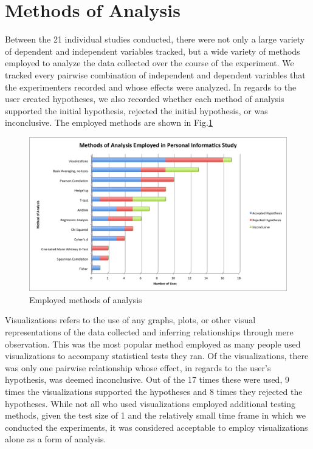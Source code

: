 \section{Methods of Analysis}
Between the 21 individual studies conducted, there were not only a large variety of dependent and independent variables tracked, but a wide variety of methods employed to analyze the data collected over the course of the experiment.  We tracked every pairwise combination of independent and dependent variables that the experimenters recorded and whose effects were analyzed.  In regards to the user created hypotheses, we also recorded whether each method of analysis supported the initial hypothesis, rejected the initial hypothesis, or was inconclusive.  The employed methods are shown in Fig.\ref{fig:analysis}

\begin{figure}[!t]\centering
\includegraphics[width=1.0\columnwidth]{images/Methods_of_Analysis.png}
\caption{\footnotesize Employed methods of analysis \label{fig:analysis} 
}%
\end{figure}


Visualizations refers to the use of any graphs, plots, or other visual representations of the data collected and inferring relationships through mere observation.  This was the most popular method employed as many people used visualizations to accompany statistical tests they ran.  Of the visualizations, there was only one pairwise relationship whose effect, in regards to the user’s hypothesis, was deemed inconclusive.  Out of the 17 times these were used, 9 times the visualizations supported the hypotheses and 8 times they rejected the hypotheses.  While not all who used visualizations employed additional testing methods, given the test size of 1 and the relatively small time frame in which we conducted the experiments, it was considered acceptable to employ visualizations alone as a form of analysis. 

